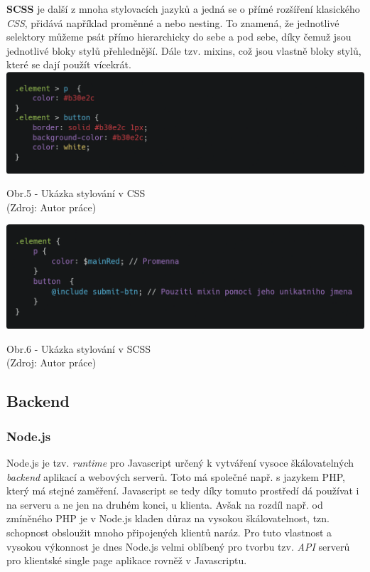 \documentclass[12pt,a4paper]{report}
\begin{document}
  \textbf{SCSS} je další z mnoha stylovacích jazyků a jedná se o přímé rozšíření klasického \emph{CSS}, přidává
  například proměnné a nebo nesting. To znamená, že jednotlivé selektory můžeme psát přímo
  hierarchicky do sebe a pod sebe, díky čemuž jsou jednotlivé bloky stylů přehlednější. Dále tzv.
  mixins, což jsou vlastně bloky stylů, které se dají použít vícekrát.
  \vfill
  \vspace*{0.5cm}
  \noindent\includegraphics[width=\linewidth]{cssCodeblock.png}
  \begin{center}
    Obr.5 - Ukázka stylování v CSS  \\
    (Zdroj: Autor práce)
  \end{center}

  \vspace*{0.5cm}
  \noindent\includegraphics[width=\linewidth]{scssCodeblock.png}
  \begin{center}
    Obr.6 -  Ukázka stylování v SCSS  \\
    (Zdroj: Autor práce)
  \end{center}

  \subsection{Backend}
  \subsubsection{Node.js}
  Node.js je tzv. \emph{runtime} pro Javascript určený k vytváření vysoce škálovatelných \emph{backend} aplikací a
  webových serverů. Toto má společné např. s jazykem PHP, který má stejné zaměření. Javascript se
  tedy díky tomuto prostředí dá používat i na serveru a ne jen na druhém konci, u klienta. Avšak na
  rozdíl např. od zmíněného PHP je v Node.js kladen důraz na vysokou škálovatelnost, tzn.
  schopnost obsloužit mnoho připojených klientů naráz. Pro tuto vlastnost a vysokou výkonnost je
  dnes Node.js velmi oblíbený pro tvorbu tzv. \emph{API} serverů pro klientské single page aplikace rovněž v
  Javascriptu. 
\end{document}

